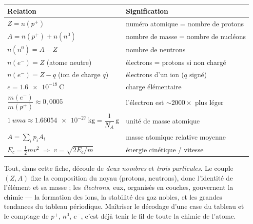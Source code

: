 \documentclass[11pt,a4paper]{article}
\newcommand{\pp}{p^{+}}      %
\newcommand{\ee}{e^{-}}      %
\newcommand{\nz}{n^{0}}      %
\newcommand{\np}{n(\pp)}     %
\renewcommand{\ne}{n(\ee)}   %
\newcommand{\nnn}{n(\nz)}    %
\begin{document}
\begin{center}
\renewcommand{\arraystretch}{1.6}
\begin{tabular}{>{\raggedright\arraybackslash}p{6.4cm} >{\raggedright\arraybackslash}p{8.5cm}}
\rowcolor{primary!18}
\textbf{Relation} & \textbf{Signification} \\
\midrule
\rowcolor{primary!4}
$Z = \np$ & numéro atomique = nombre de protons \\
$A = \np + \nnn$ & nombre de masse = nombre de nucléons \\
\rowcolor{primary!4}
$\nnn = A - Z$ & nombre de neutrons \\
$\ne = Z$ (atome neutre) & électrons = protons si non chargé \\
\rowcolor{primary!4}
$\ne = Z - q$ (ion de charge $q$) & électrons d'un ion ($q$ signé) \\
$e = \SI{1,6e-19}{\coulomb}$ & charge élémentaire \\
\rowcolor{primary!4}
$\dfrac{m(\ee)}{m(\pp)} \approx 0{,}0005$ & l'électron est $\sim 2000\times$ plus léger \\
$\SI{1}{uma} \approx \SI{1,66054e-27}{\kilo\gram} = \dfrac{1}{N_{\!A}}\,\si{\gram}$ & unité de masse atomique \\
\rowcolor{primary!4}
$\overline{A} = \sum_i p_i A_i$ & masse atomique relative moyenne \\
$E_c = \tfrac12 m v^2 \;\Rightarrow\; v = \sqrt{2E_c/m}$ & énergie cinétique / vitesse \\
\bottomrule
\end{tabular}
\end{center}

\vspace{0.4cm}
\begin{tcolorbox}[boxbase,colback=primarydark!5,colframe=primarydark,
   title={\textsc{Le mot de la fin}}]
Tout, dans cette fiche, découle de \emph{deux nombres} et \emph{trois particules}. Le couple
$(Z, A)$ fixe la composition du noyau (protons, neutrons), donc l'identité de l'élément et sa masse ;
les \emph{électrons}, eux, organisés en couches, gouvernent la chimie — la formation des ions, la
stabilité des gaz nobles, et les grandes tendances du tableau périodique. Maîtriser le décodage d'une
case du tableau et le comptage de $\pp$, $\nz$, $\ee$, c'est déjà tenir le fil de toute la chimie de
l'atome.
\end{tcolorbox}
\end{document}
